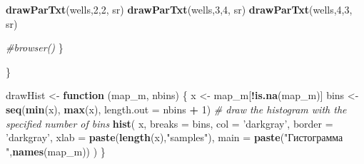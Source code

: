 \documentclass[]{article}
\newenvironment{Shaded}{\begin{snugshade}}{\end{snugshade}}
\newcommand{\KeywordTok}[1]{\textcolor[rgb]{0.13,0.29,0.53}{\textbf{#1}}}
\newcommand{\DataTypeTok}[1]{\textcolor[rgb]{0.13,0.29,0.53}{#1}}
\newcommand{\DecValTok}[1]{\textcolor[rgb]{0.00,0.00,0.81}{#1}}
\newcommand{\StringTok}[1]{\textcolor[rgb]{0.31,0.60,0.02}{#1}}
\newcommand{\CommentTok}[1]{\textcolor[rgb]{0.56,0.35,0.01}{\textit{#1}}}
\newcommand{\ControlFlowTok}[1]{\textcolor[rgb]{0.13,0.29,0.53}{\textbf{#1}}}
\newcommand{\OperatorTok}[1]{\textcolor[rgb]{0.81,0.36,0.00}{\textbf{#1}}}
\newcommand{\NormalTok}[1]{#1}
\begin{document}
\begin{Shaded}
\begin{Highlighting}[]
{{{{    \KeywordTok{drawParTxt}\NormalTok{(wells,}\DecValTok{2}\NormalTok{,}\DecValTok{2}\NormalTok{, sr)}
    \KeywordTok{drawParTxt}\NormalTok{(wells,}\DecValTok{3}\NormalTok{,}\DecValTok{4}\NormalTok{, sr)}
    \KeywordTok{drawParTxt}\NormalTok{(wells,}\DecValTok{4}\NormalTok{,}\DecValTok{3}\NormalTok{, sr)}
    
    \CommentTok{#browser()}
\NormalTok{  \}}
  
\NormalTok{\}}


\NormalTok{drawHist <-}\StringTok{ }\ControlFlowTok{function}\NormalTok{ (map_m, nbins) \{}
\NormalTok{  x <-}\StringTok{ }\NormalTok{map_m[}\OperatorTok{!}\KeywordTok{is.na}\NormalTok{(map_m)]}
\NormalTok{  bins <-}\StringTok{ }\KeywordTok{seq}\NormalTok{(}\KeywordTok{min}\NormalTok{(x), }\KeywordTok{max}\NormalTok{(x), }\DataTypeTok{length.out =}\NormalTok{ nbins }\OperatorTok{+}\StringTok{ }\DecValTok{1}\NormalTok{)}
  \CommentTok{# draw the histogram with the specified number of bins}
  \KeywordTok{hist}\NormalTok{(}
\NormalTok{    x,}
    \DataTypeTok{breaks =}\NormalTok{ bins,}
    \DataTypeTok{col =} \StringTok{'darkgray'}\NormalTok{,}
    \DataTypeTok{border =} \StringTok{'darkgray'}\NormalTok{,}
    \DataTypeTok{xlab =} \KeywordTok{paste}\NormalTok{(}\KeywordTok{length}\NormalTok{(x),}\StringTok{"samples"}\NormalTok{),}
    \DataTypeTok{main =} \KeywordTok{paste}\NormalTok{(}\StringTok{"Гистограмма "}\NormalTok{,}\KeywordTok{names}\NormalTok{(map_m))}
\NormalTok{  )}
\NormalTok{\}}

}}}}
\end{Highlighting}
\end{Shaded}
\end{document}
